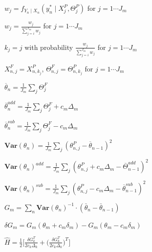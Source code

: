 \documentclass[twoside,openright]{report}
\begin{document}
\begin{algorithm}[]
\begin{algorithmic}
            \State $w_j = f_{Y_n \mid X_n}(y^{*}_n \mid X^{P}_{j}, \Theta^{P}_j )$ for $j = 1 \cdots J_m$ 
            
            \State $w_j = \frac{ w_j }{  \sum_{j = i}^{J_m} w_j }$ for $j = 1 \cdots J_m$  
            
            \State $k_j = j$ with probability $\frac{w_j}{ \sum_{j = i}^{J_m} w_j }$ for $j = 1 \cdots J_m$ 
            
            \State   $X^{F}_{n,j} = X^P_{n,k_j }$, $\Theta^{F}_{n,j} = \Theta^{P}_{n,k_j }$ for $j = 1 \cdots J_m$
            
            \State $\overline{\theta}_{n} = \frac{1}{J_m} \sum_{j} \Theta^{F}_j $ 
            
            \State $\overline{\theta}_{n}^{add} = \frac{1}{J_m} \sum_{j} \Theta^{F}_j + c_m \Delta_m$
            
            \State $\overline{\theta}_{n}^{sub} = \frac{1}{J_m} \sum_{j} \Theta^{F}_j - c_m \Delta_m$
            
            \State $\mathbf{Var} (\theta_n ) = \frac{1}{J_m} \sum_{j} ( \theta^{P}_{n,j} - \overline{\theta}_{n-1})^2$ 
            
            \State $\mathbf{Var} (\theta_n )^{add} = \frac{1}{J_m} \sum_{j} ( \theta^{P}_{n,j} + c_m \Delta_m - \overline{\Theta}_{n-1}^{add} )^2$ 
            
            \State $\mathbf{Var} (\theta_n )^{sub} = \frac{1}{J_m} \sum_{j} ( \theta^{P}_{n,j} - c_m \Delta_m - \overline{\theta}_{n-1}^{sub})^2$ 
        
        \EndFor
        
        \State $G_m = \sum_{n} \mathbf{Var} ( \theta_n ) ^{-1} \cdot ( \bar{\theta}_{n} - \bar{\theta}_{n-1} )$
        
        \State $\delta G_m = G_m(\theta_m + c_m \delta_m) - G_m(\theta_m - c_m \delta_m)$
        
        \State $\hat{H} =  \frac{1}{2} \Big[ \frac{\delta G_{k}^{T}}{2 c_k \Delta_k } + \Big( \frac{\delta G_{k}^{T}}{2 c_k \Delta_k } \Big)^{T} \Big]$
        

\end{algorithmic}
\end{algorithm}
\end{document}
